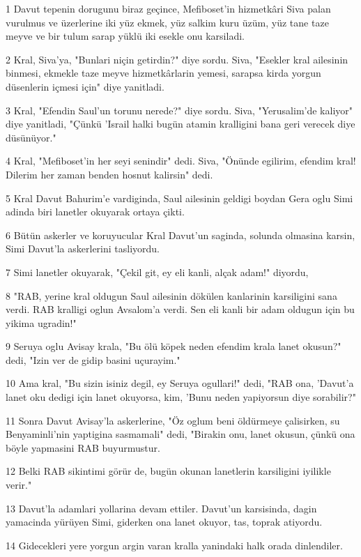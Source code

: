 \par 1 Davut tepenin dorugunu biraz geçince, Mefiboset'in hizmetkâri Siva palan vurulmus ve üzerlerine iki yüz ekmek, yüz salkim kuru üzüm, yüz tane taze meyve ve bir tulum sarap yüklü iki esekle onu karsiladi.
\par 2 Kral, Siva'ya, "Bunlari niçin getirdin?" diye sordu. Siva, "Esekler kral ailesinin binmesi, ekmekle taze meyve hizmetkârlarin yemesi, sarapsa kirda yorgun düsenlerin içmesi için" diye yanitladi.
\par 3 Kral, "Efendin Saul'un torunu nerede?" diye sordu. Siva, "Yerusalim'de kaliyor" diye yanitladi, "Çünkü 'Israil halki bugün atamin kralligini bana geri verecek diye düsünüyor."
\par 4 Kral, "Mefiboset'in her seyi senindir" dedi. Siva, "Önünde egilirim, efendim kral! Dilerim her zaman benden hosnut kalirsin" dedi.
\par 5 Kral Davut Bahurim'e vardiginda, Saul ailesinin geldigi boydan Gera oglu Simi adinda biri lanetler okuyarak ortaya çikti.
\par 6 Bütün askerler ve koruyucular Kral Davut'un saginda, solunda olmasina karsin, Simi Davut'la askerlerini tasliyordu.
\par 7 Simi lanetler okuyarak, "Çekil git, ey eli kanli, alçak adam!" diyordu,
\par 8 "RAB, yerine kral oldugun Saul ailesinin dökülen kanlarinin karsiligini sana verdi. RAB kralligi oglun Avsalom'a verdi. Sen eli kanli bir adam oldugun için bu yikima ugradin!"
\par 9 Seruya oglu Avisay krala, "Bu ölü köpek neden efendim krala lanet okusun?" dedi, "Izin ver de gidip basini uçurayim."
\par 10 Ama kral, "Bu sizin isiniz degil, ey Seruya ogullari!" dedi, "RAB ona, 'Davut'a lanet oku dedigi için lanet okuyorsa, kim, 'Bunu neden yapiyorsun diye sorabilir?"
\par 11 Sonra Davut Avisay'la askerlerine, "Öz oglum beni öldürmeye çalisirken, su Benyaminli'nin yaptigina sasmamali" dedi, "Birakin onu, lanet okusun, çünkü ona böyle yapmasini RAB buyurmustur.
\par 12 Belki RAB sikintimi görür de, bugün okunan lanetlerin karsiligini iyilikle verir."
\par 13 Davut'la adamlari yollarina devam ettiler. Davut'un karsisinda, dagin yamacinda yürüyen Simi, giderken ona lanet okuyor, tas, toprak atiyordu.
\par 14 Gidecekleri yere yorgun argin varan kralla yanindaki halk orada dinlendiler.
